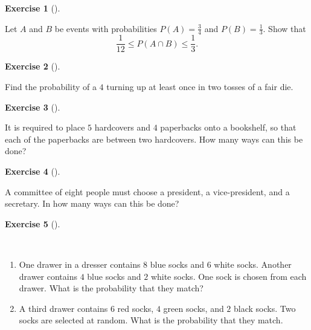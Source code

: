 \documentclass[
  letterpaper,
  DIV=11,
  numbers=noendperiod]{scrreprt}
\providecommand{\tightlist}{%
  \setlength{\itemsep}{0pt}\setlength{\parskip}{0pt}}\usepackage{longtable,booktabs,array}
\theoremstyle{definition}
\newtheorem{exercise}{Exercise}[chapter]
\theoremstyle{definition}
\theoremstyle{definition}
\theoremstyle{remark}
\begin{document}
\begin{exercise}[]\protect\hypertarget{exr-3.10}{}\label{exr-3.10}

Let \(A\) and \(B\) be events with probabilities \(P(A) = \frac{3}{4}\)
and \(P(B) = \frac{1}{3}\). Show that
\[\frac{1}{12}\leq P(A\cap B)\leq\frac{1}{3}.\]

\end{exercise}

\begin{exercise}[]\protect\hypertarget{exr-3.11}{}\label{exr-3.11}

Find the probability of a \(4\) turning up at least once in two tosses
of a fair die.

\end{exercise}

\begin{exercise}[]\protect\hypertarget{exr-3.12}{}\label{exr-3.12}

It is required to place \(5\) hardcovers and \(4\) paperbacks onto a
bookshelf, so that each of the paperbacks are between two hardcovers.
How many ways can this be done?

\end{exercise}

\begin{exercise}[]\protect\hypertarget{exr-3.13}{}\label{exr-3.13}

A committee of eight people must choose a president, a vice-president,
and a secretary. In how many ways can this be done?

\end{exercise}

\begin{exercise}[]\protect\hypertarget{exr-3.14}{}\label{exr-3.14}

~

\begin{enumerate}
\def\labelenumi{\alph{enumi}.}
\tightlist
\item
  One drawer in a dresser contains \(8\) blue socks and \(6\) white
  socks. Another drawer contains \(4\) blue socks and \(2\) white socks.
  One sock is chosen from each drawer. What is the probability that they
  match?
\item
  A third drawer contains \(6\) red socks, \(4\) green socks, and \(2\)
  black socks. Two socks are selected at random. What is the probability
  that they match.
\end{enumerate}

\end{exercise}
\end{document}
